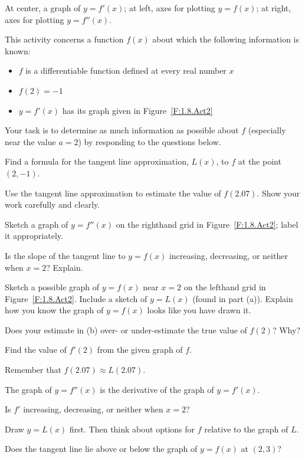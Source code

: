 \begin{marginfigure}[6cm]
\caption{At center, a graph of $y = f'(x)$; at left, axes for plotting $y = f(x)$; at right, axes for plotting $y = f''(x)$.} \label{F:1.8.Act2}
\end{marginfigure}

\begin{activity} \label{A:1.8.2}
This activity concerns a function $f(x)$ about which the following information is known:
\begin{itemize}
	\item $f$ is a differentiable function defined at every real number $x$
	\item $f(2) = -1$
	\item $y = f'(x)$ has its graph given in Figure~\ref{F:1.8.Act2}
\end{itemize}


Your task is to determine as much information as possible about $f$ (especially near the value $a = 2$) by responding to the questions below.
\ba
	\item Find a formula for the tangent line approximation, $L(x)$, to $f$ at the point $(2,-1)$.
	\item Use the tangent line approximation to estimate the value of $f(2.07)$.  Show your work carefully and clearly.
	\item Sketch a graph of $y = f''(x)$ on the righthand grid in Figure~\ref{F:1.8.Act2}; label it appropriately.
	\item Is the slope of the tangent line to $y = f(x)$ increasing, decreasing, or neither when $x = 2$?  Explain.
	\item Sketch a possible graph of $y = f(x)$ near $x = 2$ on the lefthand grid in Figure~\ref{F:1.8.Act2}.  Include a sketch of $y=L(x)$ (found in part (a)).  Explain how you know the graph of $y = f(x)$ looks like you have drawn it.   
	\item Does your estimate in (b) over- or under-estimate the true value of $f(2)$?  Why?
\ea
\end{activity}
\begin{smallhint}
\ba
	\item Find the value of $f'(2)$ from the given graph of $f$.
	\item Remember that $f(2.07) \approx L(2.07)$.
	\item The graph of $y = f''(x)$ is the derivative of the graph of $y = f'(x)$.
	\item Is $f'$ increasing, decreasing, or neither when $x = 2$? 
	\item Draw $y = L(x)$ first.  Then think about options for $f$ relative to the graph of $L$.  
	\item Does the tangent line lie above or below the graph of $y = f(x)$ at $(2,3)$?
\ea
\end{smallhint}
